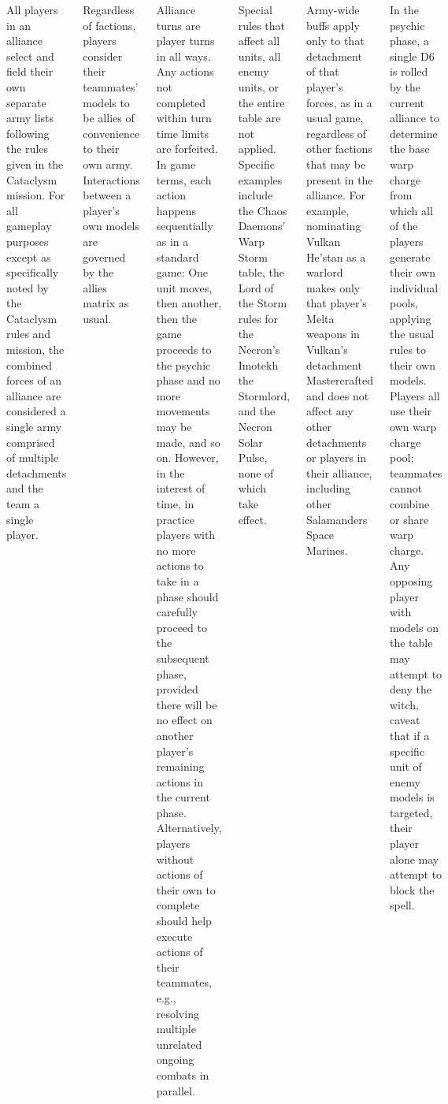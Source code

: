 \begin{columns}
  All players in an alliance select and
field their own separate army lists following the rules given in the
Cataclysm mission.  For all gameplay purposes except as specifically
noted by the Cataclysm rules and mission, the combined forces of an
alliance are considered a single army comprised of multiple
detachments and the team a single player.

  Regardless of factions, players consider
their teammates' models to be allies of convenience to their own army.
Interactions between a player's own models are governed by the allies
matrix as usual.

  Alliance turns are player turns in all
ways.  Any actions not completed within turn time limits are
forfeited.  In game terms, each action happens sequentially as in a
standard game: One unit moves, then another, then the game proceeds to
the psychic phase and no more movements may be made, and so on.
However, in the interest of time, in practice players with no more
actions to take in a phase should carefully proceed to the subsequent
phase, provided there will be no effect on another player's remaining
actions in the current phase.  Alternatively, players without actions
of their own to complete should help execute actions of their
teammates, e.g., resolving multiple unrelated ongoing combats in
parallel.

  Special rules that affect all
units, all enemy units, or the entire table are not applied.  Specific
examples include the Chaos Daemons' Warp Storm table, the Lord of the
Storm rules for the Necron's Imotekh the Stormlord, and the Necron
Solar Pulse, none of which take effect.

Army-wide buffs apply only to that detachment of that player's forces,
as in a usual game, regardless of other factions that may be present
in the alliance.  For example, nominating Vulkan He'stan as a warlord
makes only that player's Melta weapons in Vulkan's detachment
Mastercrafted and does not affect any other detachments or players in
their alliance, including other Salamanders Space Marines.

  In the psychic phase, a single D6
is rolled by the current alliance to determine the base warp charge
from which all of the players generate their own individual pools,
applying the usual rules to their own models.  Players all use their
own warp charge pool; teammates cannot combine or share warp charge.
Any opposing player with models on the table may attempt to deny the
witch, caveat that if a specific unit of enemy models is targeted,
their player alone may attempt to block the spell.



\end{columns}
